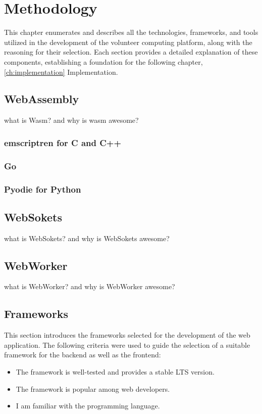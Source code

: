 \chapter{Methodology}
\label{ch:methodology}
This chapter enumerates and describes all the technologies, frameworks, and tools utilized in the development of the volunteer computing platform, along with the reasoning for their selection. Each section provides a detailed explanation of these components, establishing a foundation for the following chapter, \ref{ch:implementation} Implementation.

\section{WebAssembly}
\label{sec:methodology:wasm}
what is Wasm? and why is wasm awesome?
\subsection{emscriptren for C and C++}
\label{subsec:methodology:wasm:cpp}
\subsection{Go}
\label{subsec:methodology:wasm:go}
\subsection{Pyodie for Python}
\label{subsec:methodology:wasm:python}

\section{WebSokets}
\label{sec:methodology:websokets}
what is WebSokets? and why is WebSokets awesome?

\section{WebWorker}
\label{sec:methodology:webworker}
what is WebWorker? and why is WebWorker awesome?

\section{Frameworks}
\label{sec:methodology:frameworks}
This section introduces the frameworks selected for the development of the web application. The following criteria were used to guide the selection of a suitable framework for the backend as well as the frontend:
\begin{itemize}
    \item The framework is well-tested and provides a stable \ac{LTS} version.
    \item The framework is popular among web developers.
    \item I am familiar with the programming language.
\end{itemize}

